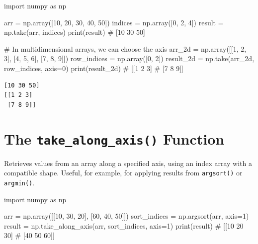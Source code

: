 \documentclass[
  english,
  letterpaper,
  DIV=11,
  numbers=noendperiod]{scrreprt}
\newenvironment{Shaded}{\begin{snugshade}}{\end{snugshade}}
\newcommand{\BuiltInTok}[1]{\textcolor[rgb]{0.00,0.23,0.31}{#1}}
\newcommand{\CommentTok}[1]{\textcolor[rgb]{0.37,0.37,0.37}{#1}}
\newcommand{\DecValTok}[1]{\textcolor[rgb]{0.68,0.00,0.00}{#1}}
\newcommand{\ImportTok}[1]{\textcolor[rgb]{0.00,0.46,0.62}{#1}}
\newcommand{\NormalTok}[1]{\textcolor[rgb]{0.00,0.23,0.31}{#1}}
\newcommand{\OperatorTok}[1]{\textcolor[rgb]{0.37,0.37,0.37}{#1}}
\begin{document}
\begin{Shaded}
\begin{Highlighting}[]
\ImportTok{import}\NormalTok{ numpy }\ImportTok{as}\NormalTok{ np}

\NormalTok{arr }\OperatorTok{=}\NormalTok{ np.array([}\DecValTok{10}\NormalTok{, }\DecValTok{20}\NormalTok{, }\DecValTok{30}\NormalTok{, }\DecValTok{40}\NormalTok{, }\DecValTok{50}\NormalTok{])}
\NormalTok{indices }\OperatorTok{=}\NormalTok{ np.array([}\DecValTok{0}\NormalTok{, }\DecValTok{2}\NormalTok{, }\DecValTok{4}\NormalTok{])}
\NormalTok{result }\OperatorTok{=}\NormalTok{ np.take(arr, indices)}
\BuiltInTok{print}\NormalTok{(result)  }\CommentTok{\# [10 30 50]}

\CommentTok{\# In multidimensional arrays, we can choose the axis}
\NormalTok{arr\_2d }\OperatorTok{=}\NormalTok{ np.array([[}\DecValTok{1}\NormalTok{, }\DecValTok{2}\NormalTok{, }\DecValTok{3}\NormalTok{], [}\DecValTok{4}\NormalTok{, }\DecValTok{5}\NormalTok{, }\DecValTok{6}\NormalTok{], [}\DecValTok{7}\NormalTok{, }\DecValTok{8}\NormalTok{, }\DecValTok{9}\NormalTok{]])}
\NormalTok{row\_indices }\OperatorTok{=}\NormalTok{ np.array([}\DecValTok{0}\NormalTok{, }\DecValTok{2}\NormalTok{])}
\NormalTok{result\_2d }\OperatorTok{=}\NormalTok{ np.take(arr\_2d, row\_indices, axis}\OperatorTok{=}\DecValTok{0}\NormalTok{)}
\BuiltInTok{print}\NormalTok{(result\_2d)}
\CommentTok{\# [[1 2 3]}
\CommentTok{\#  [7 8 9]]}
\end{Highlighting}
\end{Shaded}

\begin{verbatim}
[10 30 50]
[[1 2 3]
 [7 8 9]]
\end{verbatim}

\section{\texorpdfstring{The \texttt{take\_along\_axis()}
Function}{The take\_along\_axis() Function}}\label{the-take_along_axis-function}

Retrieves values from an array along a specified axis, using an index
array with a compatible shape. Useful, for example, for applying results
from \texttt{argsort()} or \texttt{argmin()}.

\begin{Shaded}
\begin{Highlighting}[]
\ImportTok{import}\NormalTok{ numpy }\ImportTok{as}\NormalTok{ np}

\NormalTok{arr }\OperatorTok{=}\NormalTok{ np.array([[}\DecValTok{10}\NormalTok{, }\DecValTok{30}\NormalTok{, }\DecValTok{20}\NormalTok{], [}\DecValTok{60}\NormalTok{, }\DecValTok{40}\NormalTok{, }\DecValTok{50}\NormalTok{]])}
\NormalTok{sort\_indices }\OperatorTok{=}\NormalTok{ np.argsort(arr, axis}\OperatorTok{=}\DecValTok{1}\NormalTok{)}
\NormalTok{result }\OperatorTok{=}\NormalTok{ np.take\_along\_axis(arr, sort\_indices, axis}\OperatorTok{=}\DecValTok{1}\NormalTok{)}
\BuiltInTok{print}\NormalTok{(result)}
\CommentTok{\# [[10 20 30]}
\CommentTok{\#  [40 50 60]]}
\end{Highlighting}
\end{Shaded}
\end{document}
